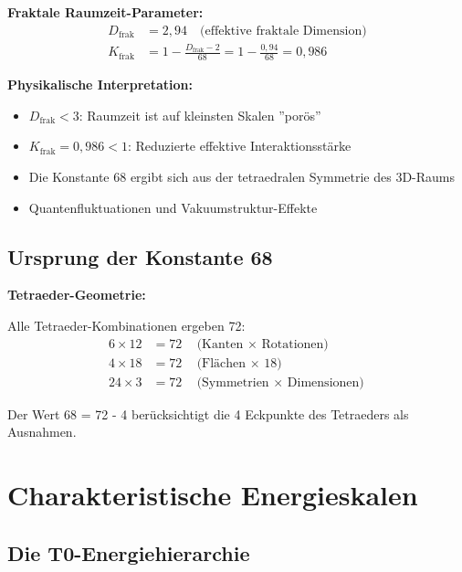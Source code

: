 	\begin{keyresult}
		\textbf{Fraktale Raumzeit-Parameter:}
		\begin{align}
			D_{\text{frak}} &= 2{,}94 \quad \text{(effektive fraktale Dimension)} \\
			K_{\text{frak}} &= 1 - \frac{D_{\text{frak}} - 2}{68} = 1 - \frac{0{,}94}{68} = 0{,}986
		\end{align}
		
		\textbf{Physikalische Interpretation:}
		\begin{itemize}
			\item $D_{\text{frak}} < 3$: Raumzeit ist auf kleinsten Skalen ''porös''
			\item $K_{\text{frak}} = 0{,}986 < 1$: Reduzierte effektive Interaktionsstärke
			\item Die Konstante 68 ergibt sich aus der tetraedralen Symmetrie des 3D-Raums
			\item Quantenfluktuationen und Vakuumstruktur-Effekte
		\end{itemize}
	\end{keyresult}
	
	\subsection{Ursprung der Konstante 68}
	
	\begin{alternative}
		\textbf{Tetraeder-Geometrie:}
		
		Alle Tetraeder-Kombinationen ergeben 72:
		\begin{align}
			6 \times 12 &= 72 \quad \text{(Kanten $\times$ Rotationen)} \\
			4 \times 18 &= 72 \quad \text{(Flächen $\times$ 18)} \\
			24 \times 3 &= 72 \quad \text{(Symmetrien $\times$ Dimensionen)}
		\end{align}
		
		Der Wert 68 = 72 - 4 berücksichtigt die 4 Eckpunkte des Tetraeders als Ausnahmen.
	\end{alternative}
	
	\section{Charakteristische Energieskalen}
	
	\subsection{Die T0-Energiehierarchie}
	
